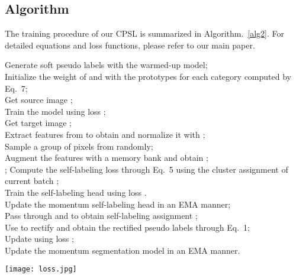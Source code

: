 \documentclass[10pt,twocolumn,letterpaper]{article}
\begin{document}
\subsection{Algorithm}
The training procedure of our CPSL is summarized in Algorithm.~\ref{alg2}. For detailed equations and loss functions, please refer to our main paper.
\begin{algorithm}[!h]
	\caption{Training Procedure of CPSL}\label{alg2}
	{Generate soft pseudo labels  with the warmed-up model;}\\
	{Initialize the weight of  and  with the prototypes  for each category computed by Eq.~7;}\\
	{	
	    {   Get source image ;\\
	        Train the model  using loss ;\\
	        \vspace{1.5em}
	        Get target image ;\\
	        Extract features from  to obtain  and normalize it with ;\\
	        Sample a group of pixels  from  randomly;\\
	        Augment the features  with a memory bank  and obtain ;\\
	            {;
	            }
	       Compute the self-labeling loss  through Eq.~5 using the cluster assignment of current batch ;\\
	       Train the self-labeling head  using loss . \\
	       \vspace{1.5em}
	       Update the momentum self-labeling head  in an EMA manner;\\
	       Pass  through  and  to obtain self-labeling assignment ;\\
	       Use  to rectify  and obtain the rectified pseudo labels  through Eq.~1;\\
	       Update  using loss ;\\
	       Update the momentum segmentation model  in an EMA manner. 
	    }
	}
\end{algorithm}
		\begin{figure*}
		\hspace{-1.0em}\centering 
		\texttt{[image: loss.jpg]}\\
		\vspace{-0.5em}
		\caption{The mIoU (left) and MPA (right) scores evaluated on the validation set during the training.}
		\label{loss}
	\end{figure*}
	
\end{document}
